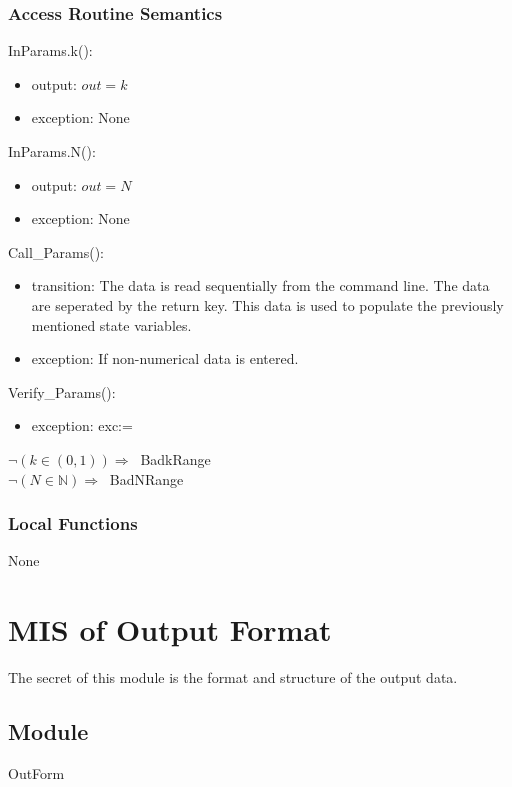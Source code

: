 \documentclass[12pt, titlepage]{article}
\begin{document}
\subsubsection{Access Routine Semantics}

\noindent InParams.k():
\begin{itemize}
\item output: $out = k$
\item exception: None
\end{itemize}

\noindent InParams.N():
\begin{itemize}
	\item output: $out = N$
	\item exception: None
\end{itemize}

\noindent Call\_Params():
\begin{itemize}
	\item transition: The data is read sequentially from the command line. The 
	data are seperated by the return key. This data is used to populate the 
	previously mentioned state variables. 
	\item exception: If non-numerical data is entered. 
\end{itemize} 

\noindent Verify\_Params():
\begin{itemize}
	\item exception: exc:=
\end{itemize}  

\noindent $\neg (k \in (0,1)) \Rightarrow \ $ BadkRange\\
$\neg (N \in \mathbb{N}) \Rightarrow \ $ BadNRange

\subsubsection{Local Functions}
None
\newpage

\section{MIS of Output Format} 

The secret of this module is the format and structure of the output data.

\subsection{Module}

OutForm
\end{document}

